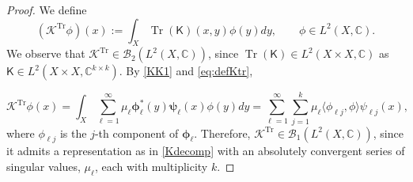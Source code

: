 \documentclass{birkjour}
\theoremstyle{definition}
\theoremstyle{remark}
\numberwithin{equation}{section}
\newcommand{\cB}{{\mathcal B}}
\begin{document}
\begin{proof}
We define
\begin{equation}\label{eq:defKtr}
    \left( \mathcal{K}^{\operatorname{Tr}} \phi \right)(x) := \int_X \operatorname{Tr}(\textsf{K})(x,y) \phi(y) dy,  \qquad {\phi} \in L^2(X,\mathbb C).
\end{equation}
We observe that $\mathcal{K}^{\operatorname{Tr}} \in \cB_2(L^2(X,\mathbb{C}))$,
since  $\operatorname{Tr}(\textsf{K}) \in L^2(X \times X, \mathbb{C})$
as ${\textsf{K}} \in  L^2(X \times X, \mathbb{C}^{k \times k})$.
By \eqref{KK1} and \eqref{eq:defKtr},

\begin{equation}
    \mathcal{K}^{\operatorname{Tr}} \phi (x) 
    = \int_X \sum_{\ell=1}^\infty \mu_\ell \boldsymbol{\phi}_\ell^*(y) \boldsymbol{\psi}_\ell (x) \phi(y) dy
   = \sum_{\ell=1}^\infty \sum_{j = 1}^k  \mu_\ell \langle \phi_{\ell j}, \phi \rangle \psi_{\ell j}(x), 
\end{equation}
where $\phi_{\ell j}$ is the $j$-th component of  $\boldsymbol{\phi}_\ell$.
Therefore, $\mathcal{K}^{\operatorname{Tr}} \in \cB_1(L^2(X,\mathbb C))$, since it
admits a representation as in  \eqref{Kdecomp}
 with an absolutely convergent series of singular values, $\mu_\ell$, each with 
 multiplicity $k$.
 


\end{proof}
\end{document}
